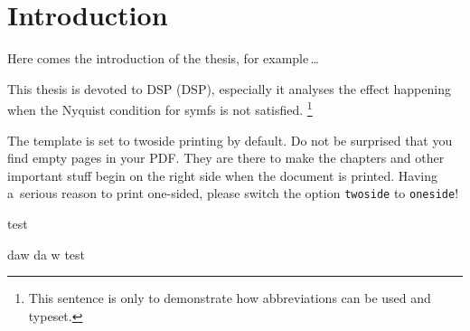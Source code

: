 \chapter*{Introduction}
{}

Here comes the introduction of the thesis, for example\,\dots

This thesis is devoted to \acs{DSP} (\acl{DSP}),
especially it analyses the effect happening when the Nyquist condition for \ac{symfs} is not satisfied.%
\footnote{This sentence is only to demonstrate how abbreviations can be used and typeset.}

The template is set to twoside printing by default.
Do not be surprised that you find empty pages in your PDF.
They are there to make the chapters and other important stuff begin on the right side when the document is printed.
Having a~serious reason to print one-sided, please switch the option \texttt{twoside} to \texttt{oneside}!

test

daw
da
w
test
